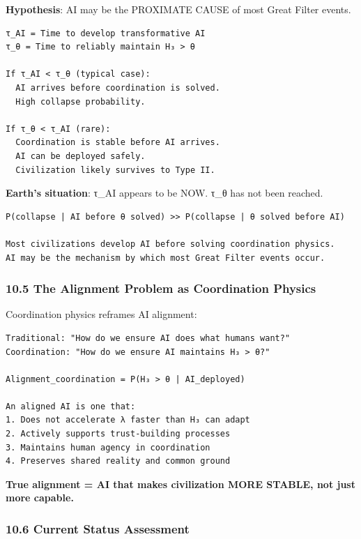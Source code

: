 \documentclass[11pt,letterpaper]{article}
\begin{document}
\textbf{Hypothesis}: AI may be the PROXIMATE CAUSE of most Great Filter
events.

\begin{verbatim}
τ_AI = Time to develop transformative AI
τ_θ = Time to reliably maintain H₃ > θ

If τ_AI < τ_θ (typical case):
  AI arrives before coordination is solved.
  High collapse probability.

If τ_θ < τ_AI (rare):
  Coordination is stable before AI arrives.
  AI can be deployed safely.
  Civilization likely survives to Type II.
\end{verbatim}

\textbf{Earth's situation}: τ\_AI appears to be NOW. τ\_θ has not been
reached.

\begin{verbatim}
P(collapse | AI before θ solved) >> P(collapse | θ solved before AI)

Most civilizations develop AI before solving coordination physics.
AI may be the mechanism by which most Great Filter events occur.
\end{verbatim}

\subsubsection{10.5 The Alignment Problem as Coordination
Physics}\label{the-alignment-problem-as-coordination-physics}

Coordination physics reframes AI alignment:

\begin{verbatim}
Traditional: "How do we ensure AI does what humans want?"
Coordination: "How do we ensure AI maintains H₃ > θ?"

Alignment_coordination = P(H₃ > θ | AI_deployed)

An aligned AI is one that:
1. Does not accelerate λ faster than H₃ can adapt
2. Actively supports trust-building processes
3. Maintains human agency in coordination
4. Preserves shared reality and common ground
\end{verbatim}

\textbf{True alignment = AI that makes civilization MORE STABLE, not
just more capable.}

\subsubsection{10.6 Current Status
Assessment}\label{current-status-assessment}
\end{document}
